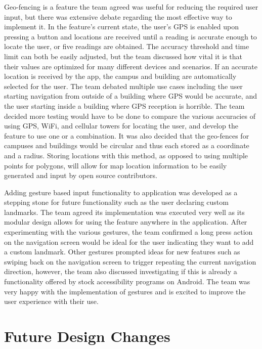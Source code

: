 \documentclass{scrreprt}
\begin{document}
Geo-fencing is a feature the team agreed was useful for reducing the required user input, but there was extensive debate regarding the most effective way to implement it. In the feature’s current state, the user's GPS is enabled upon pressing a button and locations are received until a reading is accurate enough to locate the user, or five readings are obtained. The accuracy threshold and time limit can both be easily adjusted, but the team discussed how vital it is that their values are optimized for many different devices and scenarios. If an accurate location is received by the app, the campus and building are automatically selected for the user. The team debated multiple use cases including the user starting navigation from outside of a building where GPS would be accurate, and the user starting inside a building where GPS reception is horrible. The team decided more testing would have to be done to compare the various accuracies of using GPS, WiFi, and cellular towers for locating the user, and develop the feature to use one or a combination. It was also decided that the geo-fences for campuses and buildings would be circular and thus each stored as a coordinate and a radius. Storing locations with this method, as opposed to using multiple points for polygons, will allow for map location information to be easily generated and input by open source contributors.

Adding gesture based input functionality to application was developed as a stepping stone for future functionality such as the user declaring custom landmarks. The team agreed its implementation was executed very well as its modular design allows for using the feature anywhere in the application. After experimenting with the various gestures, the team confirmed a long press action on the navigation screen would be ideal for the user indicating they want to add a custom landmark. Other gestures prompted ideas for new features such as swiping back on the navigation screen to trigger repeating the current navigation direction, however, the team also discussed investigating if this is already a functionality offered by stock accessibility programs on Android. The team was very happy with the implementation of gestures and is excited to improve the user experience with their use.

\chapter{Future Design Changes}
\end{document}
